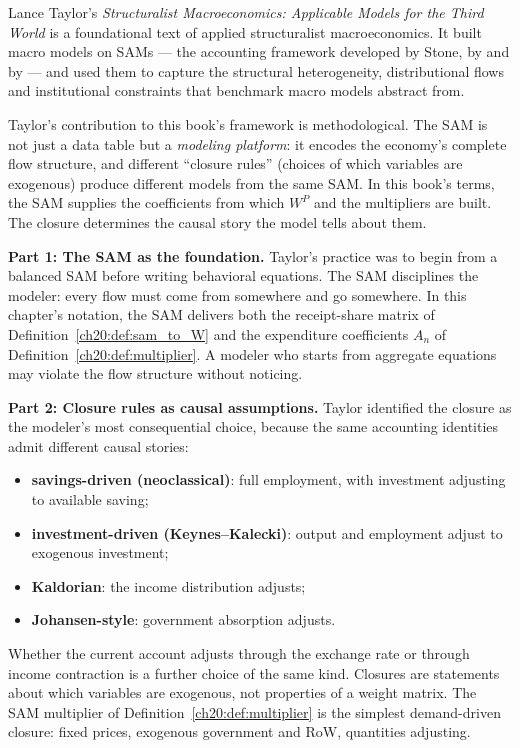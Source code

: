 \documentclass[../structural_economics_book.tex]{subfiles}
\begin{document}
Lance Taylor's \textit{Structuralist Macroeconomics: Applicable Models for the Third World} \citeyearpar{taylor1983structuralist} is a foundational text of applied structuralist macroeconomics. It built macro models on SAMs --- the accounting framework developed by Stone, by \citet{pyatt1976planning} and by \citet{pyatt1979accounting} --- and used them to capture the structural heterogeneity, distributional flows and institutional constraints that benchmark macro models abstract from.

Taylor's contribution to this book's framework is methodological. The SAM is not just a data table but a \textit{modeling platform}: it encodes the economy's complete flow structure, and different ``closure rules'' (choices of which variables are exogenous) produce different models from the same SAM. In this book's terms, the SAM supplies the coefficients from which $W^P$ and the multipliers are built. The closure determines the causal story the model tells about them.

\textbf{Part 1: The SAM as the foundation.} Taylor's practice was to begin from a balanced SAM before writing behavioral equations. The SAM disciplines the modeler: every flow must come from somewhere and go somewhere. In this chapter's notation, the SAM delivers both the receipt-share matrix of Definition~\ref{ch20:def:sam_to_W} and the expenditure coefficients $A_n$ of Definition~\ref{ch20:def:multiplier}. A modeler who starts from aggregate equations may violate the flow structure without noticing.

\textbf{Part 2: Closure rules as causal assumptions.} Taylor identified the closure as the modeler's most consequential choice, because the same accounting identities admit different causal stories:
\begin{itemize}
\item \textbf{savings-driven (neoclassical)}: full employment, with investment adjusting to available saving;
\item \textbf{investment-driven (Keynes--Kalecki)}: output and employment adjust to exogenous investment;
\item \textbf{Kaldorian}: the income distribution adjusts;
\item \textbf{Johansen-style}: government absorption adjusts.
\end{itemize}
Whether the current account adjusts through the exchange rate or through income contraction is a further choice of the same kind. Closures are statements about which variables are exogenous, not properties of a weight matrix. The SAM multiplier of Definition~\ref{ch20:def:multiplier} is the simplest demand-driven closure: fixed prices, exogenous government and RoW, quantities adjusting.
\end{document}
